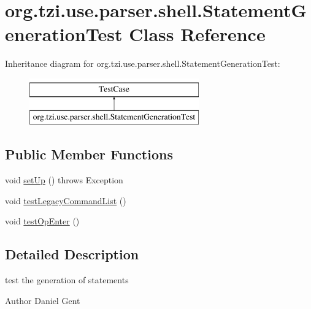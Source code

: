 \hypertarget{classorg_1_1tzi_1_1use_1_1parser_1_1shell_1_1_statement_generation_test}{\section{org.\-tzi.\-use.\-parser.\-shell.\-Statement\-Generation\-Test Class Reference}
\label{classorg_1_1tzi_1_1use_1_1parser_1_1shell_1_1_statement_generation_test}
}
Inheritance diagram for org.\-tzi.\-use.\-parser.\-shell.\-Statement\-Generation\-Test\-:\begin{figure}[H]
\begin{center}
\leavevmode
\includegraphics[height=2.000000cm]{classorg_1_1tzi_1_1use_1_1parser_1_1shell_1_1_statement_generation_test}
\end{center}
\end{figure}
\subsection*{Public Member Functions}
\begin{DoxyCompactItemize}
\item 
void \hyperlink{classorg_1_1tzi_1_1use_1_1parser_1_1shell_1_1_statement_generation_test_a85943a415a64c5f9aba34d31751fa491}{set\-Up} ()  throws Exception 
\item 
void \hyperlink{classorg_1_1tzi_1_1use_1_1parser_1_1shell_1_1_statement_generation_test_a56000ea578d6e36c109c7c27d5eda8d9}{test\-Legacy\-Command\-List} ()
\item 
void \hyperlink{classorg_1_1tzi_1_1use_1_1parser_1_1shell_1_1_statement_generation_test_a8b7ee48af127806a8f5aa9d9d088be22}{test\-Op\-Enter} ()
\end{DoxyCompactItemize}


\subsection{Detailed Description}
test the generation of statements \begin{DoxyAuthor}{Author}
Daniel Gent 
\end{DoxyAuthor}


